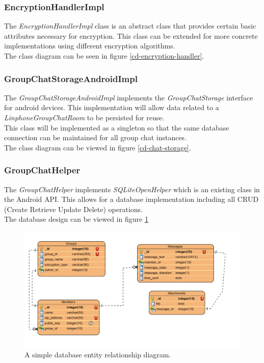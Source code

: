 \documentclass[11pt]{article}
\begin{document}
\subsubsection{EncryptionHandlerImpl}
The \textit{EncryptionHandlerImpl} class is an abstract class that provides certain basic attributes necessary for encryption. This class can be extended for more concrete implementations using different encryption algorithms.\\
The class diagram can be seen in figure \ref{cd-encryption-handler}.
\subsubsection{GroupChatStorageAndroidImpl}
The \textit{GroupChatStorageAndroidImpl} implements the \textit{GroupChatStorage} interface for android devices. This implementation will allow data related to a \textit{LinphoneGroupChatRoom} to be persisted for reuse.\\
This class will be implemented as a singleton so that the same database connection can be maintained for all group chat instances.\\
The class diagram can be viewed in figure \ref{cd-chat-storage}.\\
\subsubsection{GroupChatHelper}
The \textit{GroupChatHelper} implements \textit{SQLiteOpenHelper} which is an existing class in the Android API. This allows for a database implementation including all CRUD (Create Retrieve Update Delete) operations.\\
The database design can be viewed in figure  \ref{cd-database-ERD}\\
\begin{figure}[H]
	\centering
	\includegraphics[width=5in]{./images/database_ERD.png}
	\caption[Database Entity Relationship Diagram]{A simple database entity relationship diagram.}
	\label{cd-database-ERD}
\end{figure}
\end{document}
